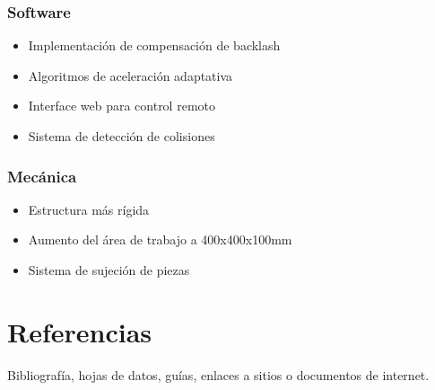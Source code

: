 \documentclass[12pt]{article}
\begin{document}
\subsubsection{Software}
\begin{itemize}
    \item Implementación de compensación de backlash
    \item Algoritmos de aceleración adaptativa
    \item Interface web para control remoto
    \item Sistema de detección de colisiones
\end{itemize}

\subsubsection{Mecánica}
\begin{itemize}
    \item Estructura más rígida 
    \item Aumento del área de trabajo a 400x400x100mm
    \item Sistema de sujeción de piezas
\end{itemize}

\section{Referencias}
Bibliografía, hojas de datos, guías, enlaces a sitios o documentos de internet.
\end{document}
